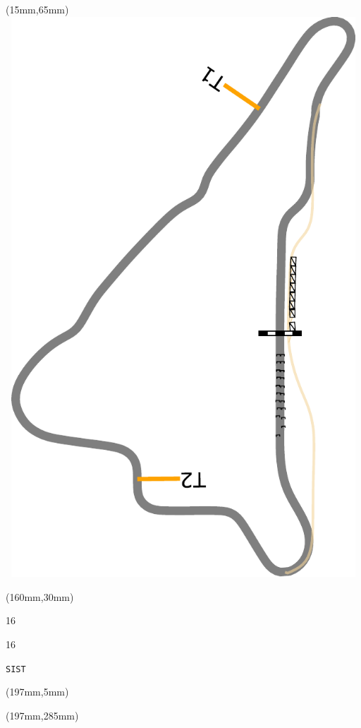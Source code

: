 \begin{textblock*}{185mm}(15mm,65mm)%
\centering
\mbox{\includegraphics[width=185mm,height=210mm,keepaspectratio]{PT/SIST.pdf}}
\end{textblock*}
\begin{textblock*}{40mm}(160mm,30mm)%
\Large
\par{} 
\par16 
\par16 
\par\hfill\tiny\tt SIST\\
\end{textblock*}
\begin{textblock*}{20mm}(197mm,5mm)%
\fbox{\thepage}
\label{SIST}
\end{textblock*}
\begin{textblock*}{20mm}(197mm,285mm)%
\fbox{\thepage}
\end{textblock*}

